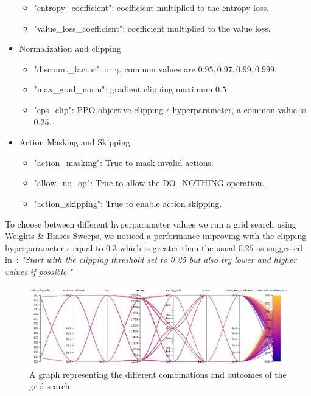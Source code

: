 \documentclass[11pt, a4paper, hidelinks]{report}
\begin{document}
\begin{itemize}
\begin{itemize}
		\item "entropy\_coefficient": coefficient multiplied to the entropy loss.
		\item "value\_loss\_coefficient": coefficient multiplied to the value loss.
	\end{itemize}
	\item Normalization and clipping
	\begin{itemize}
		\item "discount\_factor": or $\gamma$, common values are $0.95, 0.97, 0.99, 0.999$.
		\item "max\_grad\_norm": gradient clipping maximum $0.5$.
		\item "eps\_clip": PPO objective clipping $\epsilon$ hyperparameter, a common value is $0.25$.
	\end{itemize}
	\item Action Masking and Skipping
	\begin{itemize}
		\item "action\_masking": True to mask invalid actions.
		\item "allow\_no\_op": True to allow the DO\_NOTHING operation.
		\item "action\_skipping": True to enable action skipping.
	\end{itemize}
\end{itemize}


To choose between different hyperparameter values we run a grid search using Weights \& Biases Sweeps, we noticed a performance improving with the clipping hyperparameter $\epsilon$ equal to $0.3$ which is greater than the usual $0.25$ as suggested in~\citep{ppo-implementation-2}: \textit{"Start with the clipping threshold set to 0.25 but also try lower and higher values if possible."}

\begin{figure}
\centering
\includegraphics[width=1.0\textwidth]{resources/psppo_sweep.png}
\caption{A graph representing the different combinations and outcomes of the grid search.}
\label{fig:psppo_sweep}
\end{figure}
\end{document}

